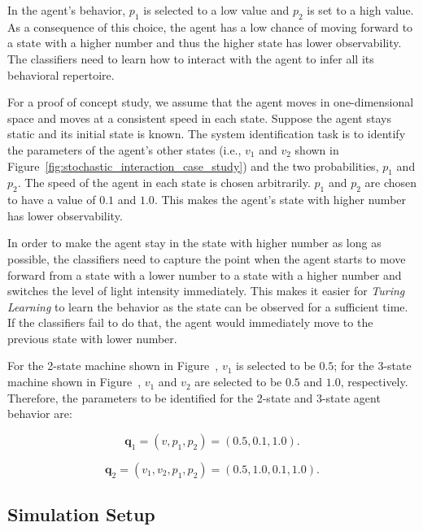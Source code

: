 In the agent's behavior, $p_1$ is selected to a low value and $p_2$ is set to a high value. As a consequence of this choice, the agent has a low chance of moving forward to a state with a higher number and thus the higher state has lower observability. The classifiers need to learn how to interact with the agent to infer all its behavioral repertoire.

For a proof of concept study, we assume that the agent moves in one-dimensional space and moves at a consistent speed in each state. Suppose the agent stays static and its initial state is known. The system identification task is to identify the parameters of the agent's other states (i.e., $v_1$ and $v_2$ shown in Figure~\ref{fig:stochastic_interaction_case_study}) and the two probabilities, $p_1$ and $p_2$. The speed of the agent in each state is chosen arbitrarily. $p_1$ and $p_2$ are chosen to have a value of $0.1$ and $1.0$. This makes the agent's state with higher number has lower observability.

In order to make the agent stay in the state with higher number as long as possible, the classifiers need to capture the point when the agent starts to move forward from a state with a lower number to a state with a higher number and switches the level of light intensity immediately. This makes it easier for \textit{Turing Learning} to learn the behavior as the state can be observed for a sufficient time. If the classifiers fail to do that, the agent would immediately move to the previous state with lower number. 

For the 2-state machine shown in Figure~, $v_1$ is selected to be $0.5$; for the 3-state machine shown in Figure~, $v_1$ and $v_2$ are selected to be $0.5$ and $1.0$, respectively. Therefore, the parameters to be identified for the 2-state and 3-state agent behavior are:

\begin{equation}\label{eq:parameters_2_states}
\mathbf{q}_1 = (v, p_1, p_2) = (0.5, 0.1, 1.0).
\end{equation}

\begin{equation}\label{eq:parameters_3_states}
\mathbf{q}_2 = (v_1, v_2, p_1, p_2) = (0.5, 1.0, 0.1, 1.0).
\end{equation}

\subsection{Simulation Setup}\label{sec:simulation_setup_stochastic_interaction}

